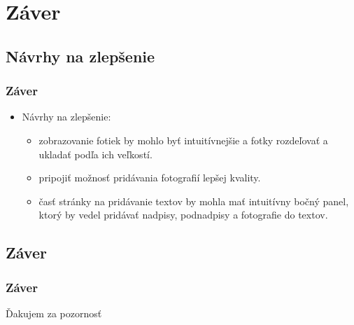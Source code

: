 \section{Záver}
\subsection{Návrhy na zlepšenie}

\begin{frame}\frametitle{Záver}
 \begin{itemize}
 \item Návrhy na zlepšenie:
           \begin{itemize}
          \item zobrazovanie fotiek by mohlo byť intuitívnejšie a fotky rozdeľovať a ukladať podľa ich veľkostí.
          \item pripojiť možnosť pridávania fotografií lepšej kvality.
          \item časť stránky na pridávanie textov by mohla mať intuitívny bočný panel, ktorý by vedel pridávať nadpisy, podnadpisy a fotografie do textov.
         \end{itemize}
 \end{itemize}

\end{frame}
\subsection{Záver}
\begin{frame}\frametitle{Záver}

\center\large Ďakujem za pozornosť



\end{frame} 
